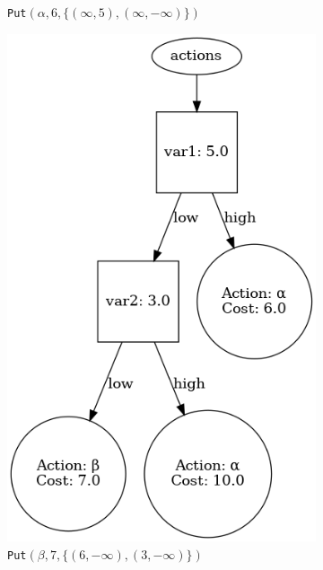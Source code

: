 \documentclass{article}
\begin{document}
\begin{figure}[H]
\begin{subfigure}[t]{0.3\textwidth}
        \captionsetup{labelformat=empty}
        \caption{%
            \texttt{Put}$(\alpha, 6, \{(\infty, 5),(\infty,-\infty)\})$
        }
    \end{subfigure}
    \begin{subfigure}[t]{0.3\textwidth}
        \centering
        \includegraphics[width=.8\textwidth]{exampleBuild2}
        \captionsetup{labelformat=empty}
        \caption{%
            \texttt{Put}$(\beta, 7, \{(6, -\infty),(3,-\infty)\})$
        }
    \end{subfigure}
    \begin{subfigure}[t]{0.35\textwidth}
        \centering

\end{subfigure}
\end{figure}
\end{document}
